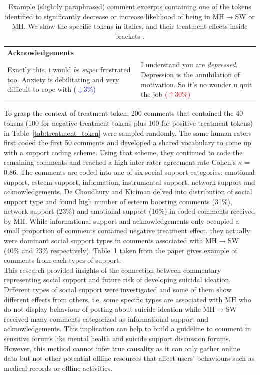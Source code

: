 \begin{table}
\begin{tabularx}{\textwidth}{XX}
\rowcolor{gray}
\textbf{Acknowledgements}&\\
Exactly this. i would \textit{be super} frustrated too. Anxiety is debilitating and very difficult to cope with \textcolor{blue}{($\downarrow$3\%)} & I understand you are \textit{depressed}. Depression is the annihilation of motivation. So it's no wonder u quit the job \textcolor{red}{($\uparrow$30\%)} \\
\bottomrule
\end{tabularx}
\caption{Example (slightly paraphrased) comment excerpts containing one of the tokens identified to significantly decrease or increase likelihood of being in MH$\rightarrow$SW or MH. We show the specific tokens in italics, and their treatment effects inside brackets \cite{DeChoudhury2017}.}
\label{tab:treatment_context}
\end{table}
To grasp the context of treatment token, 200 comments that contained the 40 tokens (100 for negative treatment tokens plus 100 for positive treatment tokens) in Table~\ref{tab:treatment_token} were sampled randomly. The same human raters first coded the first 50 comments and developed a shared vocabulary to come up with a support coding scheme. Using that scheme, they continued to code the remaining comments and reached a high inter-rater agreement rate Cohen’s $\kappa$ = 0.86. The comments are coded into one of six social support categories: emotional support, esteem support, information, instrumental support, network support and acknowledgements. De Choudhury and Kiciman delved into distribution of social support type and found high number of esteem boosting comments (31\%), network support (23\%) and emotional support (16\%) in coded comments received by MH. While informational support and acknowledgements only occupied a small proportion of comments contained negative treatment effect, they actually were dominant social support types in comments associated with MH$\rightarrow$SW (40\% and 23\% respectively). Table~\ref{tab:treatment_context} taken from the paper \cite{DeChoudhury2017} gives example of comments from each types of support.\\
This research provided insights of the connection between commentary representing social support and future risk of developing suicidal ideation. Different types of social support were investigated and some of them show different effects from others, i.e. some specific types are associated with MH who do not display behaviour of posting about suicide ideation while MH$\rightarrow$SW received many comments categorized as informational support and acknowledgements. This implication can help to build a guideline to comment in sensitive forums like mental health and suicide support discussion forums. However, this method cannot infer true causality as it can only gather online data but not other potential offline resources that affect users' behaviours such as medical records or offline activities.



  

